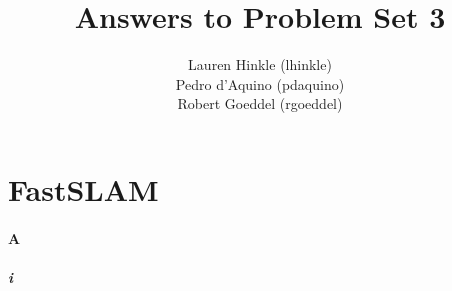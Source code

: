 \documentclass[12pt]{article}
\title{Answers to Problem Set 3}
\author{
	Lauren Hinkle (lhinkle)\\
	Pedro d'Aquino (pdaquino)\\
	Robert Goeddel (rgoeddel)}
\begin{document}
\maketitle
\pagebreak

\section{FastSLAM}

\paragraph{A}
\subparagraph{i}
\end{document}
